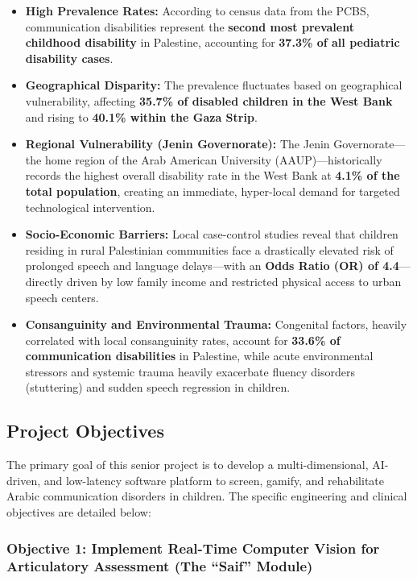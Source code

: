 \documentclass[
  letterpaper,
  DIV=11,
  numbers=noendperiod]{scrartcl}
\providecommand{\tightlist}{%
  \setlength{\itemsep}{0pt}\setlength{\parskip}{0pt}}
\begin{document}
\begin{itemize}
\tightlist
\item
  \textbf{High Prevalence Rates:} According to census data from the
  PCBS, communication disabilities represent the \textbf{second most
  prevalent childhood disability} in Palestine, accounting for
  \textbf{37.3\% of all pediatric disability cases}.
\item
  \textbf{Geographical Disparity:} The prevalence fluctuates based on
  geographical vulnerability, affecting \textbf{35.7\% of disabled
  children in the West Bank} and rising to \textbf{40.1\% within the
  Gaza Strip}.
\item
  \textbf{Regional Vulnerability (Jenin Governorate):} The Jenin
  Governorate---the home region of the Arab American University
  (AAUP)---historically records the highest overall disability rate in
  the West Bank at \textbf{4.1\% of the total population}, creating an
  immediate, hyper-local demand for targeted technological intervention.
\item
  \textbf{Socio-Economic Barriers:} Local case-control studies reveal
  that children residing in rural Palestinian communities face a
  drastically elevated risk of prolonged speech and language
  delays---with an \textbf{Odds Ratio (OR) of 4.4}---directly driven by
  low family income and restricted physical access to urban speech
  centers.
\item
  \textbf{Consanguinity and Environmental Trauma:} Congenital factors,
  heavily correlated with local consanguinity rates, account for
  \textbf{33.6\% of communication disabilities} in Palestine, while
  acute environmental stressors and systemic trauma heavily exacerbate
  fluency disorders (stuttering) and sudden speech regression in
  children.
\end{itemize}

\subsection{Project Objectives}\label{project-objectives}

The primary goal of this senior project is to develop a
multi-dimensional, AI-driven, and low-latency software platform to
screen, gamify, and rehabilitate Arabic communication disorders in
children. The specific engineering and clinical objectives are detailed
below:

\subsubsection{Objective 1: Implement Real-Time Computer Vision for
Articulatory Assessment (The ``Saif''
Module)}\label{objective-1-implement-real-time-computer-vision-for-articulatory-assessment-the-saif-module}
\end{document}
